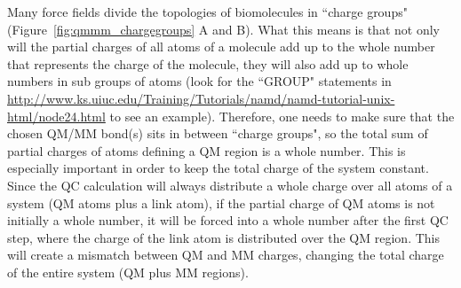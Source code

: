 Many force fields divide the topologies of biomolecules in 
``charge groups"
(Figure~\ref{fig:qmmm_chargegroups} A and B).
What this means is that 
not only will the partial charges of all atoms of a molecule 
add up to the whole number that represents the charge of the molecule, 
they will also add up to whole numbers in sub groups of atoms 
(look for the ``GROUP" statements in
\url{http://www.ks.uiuc.edu/Training/Tutorials/namd/namd-tutorial-unix-html/node24.html}
to see an example). 
Therefore, one needs to make sure that the chosen QM/MM bond(s) sits
in between ``charge groups", so the total sum of partial charges 
of atoms defining a QM region is a whole number. This is especially 
important in order to keep the total charge of the system constant. 
Since the QC calculation will always distribute a whole charge over 
all atoms of a system (QM atoms plus a link atom), if the partial charge 
of QM atoms is not initially a whole number, it will be forced into 
a whole number after the first QC step, where the charge of the link atom 
is distributed over the QM region. This will create a mismatch between 
QM and MM charges, changing the total charge of the entire system 
(QM plus MM regions).

